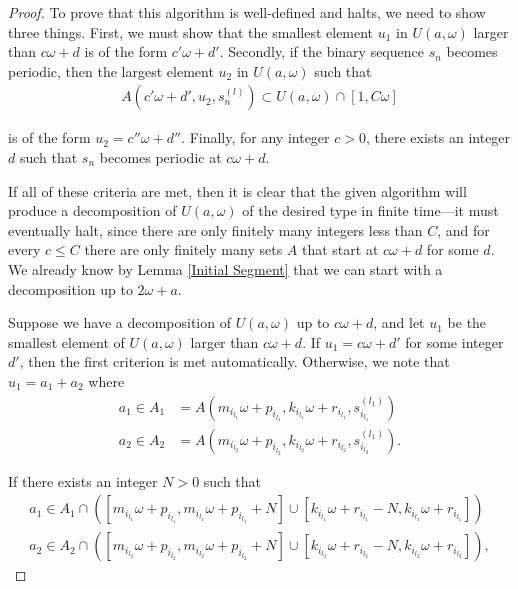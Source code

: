 \documentclass{amsart}
\theoremstyle{theorem}
\theoremstyle{definition}
\begin{document}
\begin{proof}
\noindent To prove that this algorithm is well-defined and halts, we need to show three things. First, we must show that the smallest element $u_1$ in $U(a,\omega)$ larger than $c\omega + d$ is of the form $c'\omega + d'$. Secondly, if the binary sequence $s_n$ becomes periodic, then the largest element $u_2$ in $U(a,\omega)$ such that
	\begin{align*}
	A\left(c'\omega + d', u_2, s_n^{(l)}\right) \subset U(a,\omega) \cap [1,C\omega]
	\end{align*}
		
\noindent is of the form $u_2 = c''\omega + d''$. Finally, for any integer $c > 0$, there exists an integer $d$ such that $s_n$ becomes periodic at $c\omega + d$.
	
If all of these criteria are met, then it is clear that the given algorithm will produce a decomposition of $U(a,\omega)$ of the desired type in finite time---it must eventually halt, since there are only finitely many integers less than $C$, and for every $c \leq C$ there are only finitely many sets $A$ that start at $c\omega + d$ for some $d$. We already know by Lemma \ref{Initial Segment} that we can start with a decomposition up to $2\omega + a$.
	
Suppose we have a decomposition of $U(a,\omega)$ up to $c\omega + d$, and let $u_1$ be the smallest element of $U(a,\omega)$ larger than $c\omega + d$. If $u_1 = c\omega + d'$ for some integer $d'$, then the first criterion is met automatically. Otherwise, we note that $u_1 = a_1 + a_2$ where
	\begin{align*}
	a_1 \in A_1 &= A\left(m_{i_{l_1}}\omega + p_{i_{l_1}}, k_{i_{l_1}}\omega + r_{i_{l_1}},s^{(l_1)}_{i_{l_1}}\right) \\
	a_2 \in A_2 &= A\left(m_{i_{l_2}}\omega + p_{i_{l_2}}, k_{i_{l_2}}\omega + r_{i_{l_2}},s^{(l_1)}_{i_{l_2}}\right) .
	\end{align*}
		
\noindent If there exists an integer $N > 0$ such that
	\begin{align*}
	a_1 \in A_1 \cap \left([m_{i_{l_1}}\omega + p_{i_{l_1}}, m_{i_{l_1}}\omega + p_{i_{l_1}} + N] \cup [k_{i_{l_1}}\omega + r_{i_{l_1}} - N, k_{i_{l_1}}\omega + r_{i_{l_1}}]\right) \\
	a_2 \in A_2 \cap \left([m_{i_{l_2}}\omega + p_{i_{l_2}}, m_{i_{l_2}}\omega + p_{i_{l_2}} + N] \cup [k_{i_{l_2}}\omega + r_{i_{l_2}} - N, k_{i_{l_2}}\omega + r_{i_{l_2}}]\right),
	\end{align*}
		

\end{proof}
\end{document}
